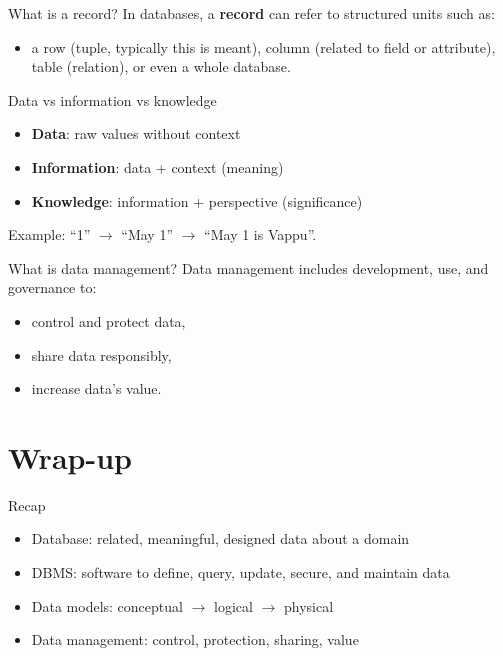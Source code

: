\documentclass[10pt,aspectratio=169]{beamer}
\begin{document}
\begin{frame}{What is a record?}
In databases, a \textbf{record} can refer to structured units such as:
\begin{itemize}
  \item a row (tuple, typically this is meant), column (related to field or attribute), table (relation), or even a whole database.
\end{itemize}
\end{frame}

\begin{frame}{Data vs information vs knowledge}
\begin{itemize}
  \item \textbf{Data}: raw values without context
  \item \textbf{Information}: data + context (meaning)
  \item \textbf{Knowledge}: information + perspective (significance)
\end{itemize}

\vspace{0.5em}
Example: ``1'' \(\rightarrow\) ``May 1'' \(\rightarrow\) ``May 1 is Vappu''.
\end{frame}

\begin{frame}{What is data management?}
Data management includes development, use, and governance to:
\begin{itemize}
  \item control and protect data,
  \item share data responsibly,
  \item increase data's value.
\end{itemize}
\end{frame}

\section{Wrap-up}

\begin{frame}{Recap}
\begin{itemize}
  \item Database: related, meaningful, designed data about a domain
  \item DBMS: software to define, query, update, secure, and maintain data
  \item Data models: conceptual \(\rightarrow\) logical \(\rightarrow\) physical
  \item Data management: control, protection, sharing, value
\end{itemize}
\end{frame}
\end{document}
